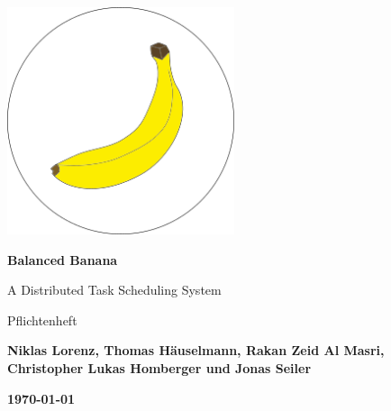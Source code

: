 \begin{titlepage}
    \begin{center}
    
     \vspace*{0.8cm}
 
        \includegraphics[width=0.5\textwidth]{balancedbanana}
        \vspace*{1cm}
 
        \Huge
        \textbf{Balanced Banana}
 
        \vspace{0.5cm}
        \LARGE
        A Distributed Task Scheduling System
        
        \vspace{0.5 cm}
        \LARGE
        Pflichtenheft
 
        \vspace{1.5cm}

        \large
        \textbf{Niklas Lorenz, Thomas Häuselmann, Rakan Zeid Al Masri, Christopher Lukas Homberger und Jonas Seiler}
 
        \vspace*{0.5cm}

        \textbf{\today}
 
       
        
 
    \end{center}
\end{titlepage}